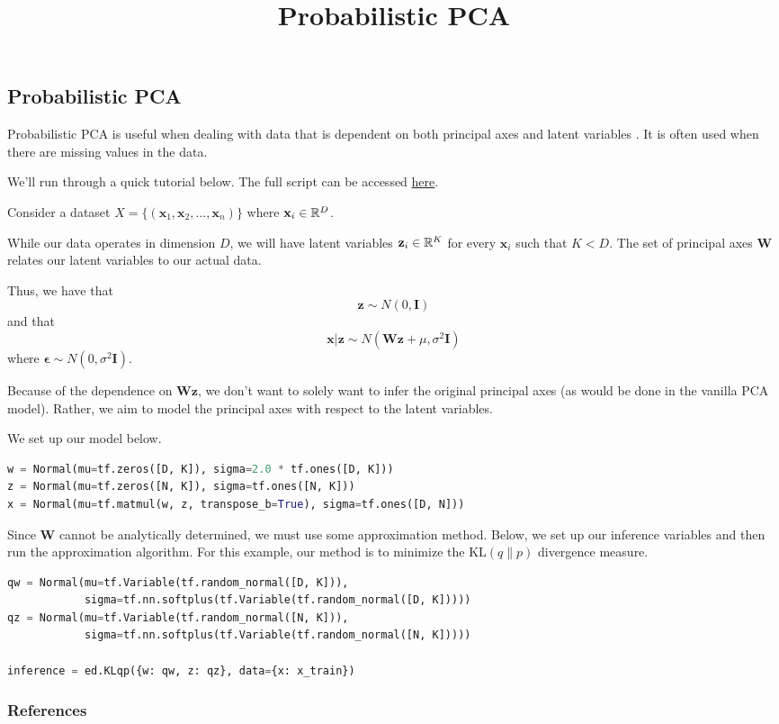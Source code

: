 \newcommand{\R}{ \mbox{${\Bbb R}$}}


\title{Probabilistic PCA}

\subsection{Probabilistic PCA}

Probabilistic PCA is useful when dealing with data that is dependent on both principal axes and latent variables \citep{Tipping99probabilisticprincipal}. It is often used when there are missing values in the data.

We'll run through a quick tutorial below. The full script can be accessed
\href{https://github.com/blei-lab/edward/blob/master/examples/probabilistic_pca.py}
{here}.

Consider a dataset $X = \{(\mathbf{x}_1, \mathbf{x}_2,\ldots , \mathbf{x}_n)\}$ where $\mathbf{x}_i \in \Bbb{R}^D$.

While our data operates in dimension $D$, we will have latent variables $\mathbf{z}_i \in \Bbb{R}^K$ for every $\mathbf{x}_i$ such that $K < D$. The set of principal axes $\mathbf{W}$ relates our latent variables to our actual data.

Thus, we have that $$\mathbf{z} \sim N(0, \mathbf{I})$$ and that $$\mathbf{x} \vert \mathbf{z} \sim N(\mathbf{Wz} + \mu, \sigma^2\mathbf{I})$$ where $\mathbf{\epsilon} \sim N(0, \sigma^2\mathbf{I})$.

Because of the dependence on $\mathbf{Wz}$, we don't want to solely want to infer the original principal axes (as would be done in the vanilla PCA model). Rather, we aim to model the principal axes with respect to the latent variables.

We set up our model below.

\begin{lstlisting}[language=Python]
w = Normal(mu=tf.zeros([D, K]), sigma=2.0 * tf.ones([D, K]))
z = Normal(mu=tf.zeros([N, K]), sigma=tf.ones([N, K]))
x = Normal(mu=tf.matmul(w, z, transpose_b=True), sigma=tf.ones([D, N]))

\end{lstlisting}

Since $\mathbf{W}$ cannot be analytically determined, we must use some approximation method. Below, we set up our inference variables and then run the approximation algorithm. For this example, our method is to minimize the $\text{KL}(q\|p)$ divergence measure.

\begin{lstlisting}[language=Python]
qw = Normal(mu=tf.Variable(tf.random_normal([D, K])),
            sigma=tf.nn.softplus(tf.Variable(tf.random_normal([D, K]))))
qz = Normal(mu=tf.Variable(tf.random_normal([N, K])),
            sigma=tf.nn.softplus(tf.Variable(tf.random_normal([N, K]))))

inference = ed.KLqp({w: qw, z: qz}, data={x: x_train})
\end{lstlisting}

\subsubsection{References}\label{references}
